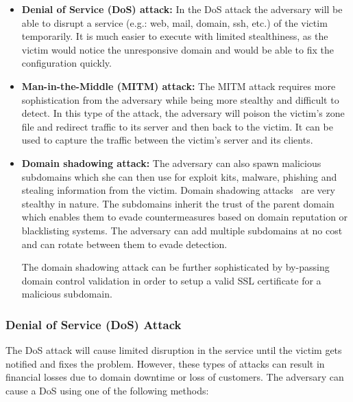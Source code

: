 \begin{itemize}
\item \textbf{Denial of Service (DoS) attack:} In the DoS attack the adversary will be able to disrupt a service (e.g.: web, mail, domain, ssh, etc.) of the victim temporarily. 
It is much easier to execute with limited stealthiness, as the victim would notice the unresponsive domain and would be able to fix the configuration quickly. 


\item \textbf{Man-in-the-Middle (MITM) attack:} The MITM attack requires more sophistication from the adversary while being more stealthy and difficult to detect. In this type of the attack, %
the adversary will %
poison the victim's zone file and redirect traffic to its server and then back to the victim. %
It can be used to capture the traffic between the victim's server and its clients. %

\item \textbf{Domain shadowing attack:} %
The adversary %
can also spawn malicious subdomains which she can then use for exploit kits, malware, phishing and stealing information from the victim. 
Domain shadowing attacks~\cite{shadowing} are %
very stealthy in nature. 
The subdomains inherit the trust of the parent domain which enables them to evade countermeasures based on domain reputation or blacklisting systems. 
The adversary can %
add multiple subdomains at no cost and can rotate between them to evade detection. 

The domain shadowing attack can be further sophisticated by by-passing domain control validation in order to setup a valid SSL certificate for a malicious subdomain.

\end{itemize}



\subsubsection{Denial of Service (DoS) Attack} 
The DoS attack will %
cause limited disruption in the service until the victim gets notified and fixes the problem. However, these types of attacks can result in financial losses due to domain downtime or loss of customers. The adversary can cause %
 a DoS using one of the following methods: %

